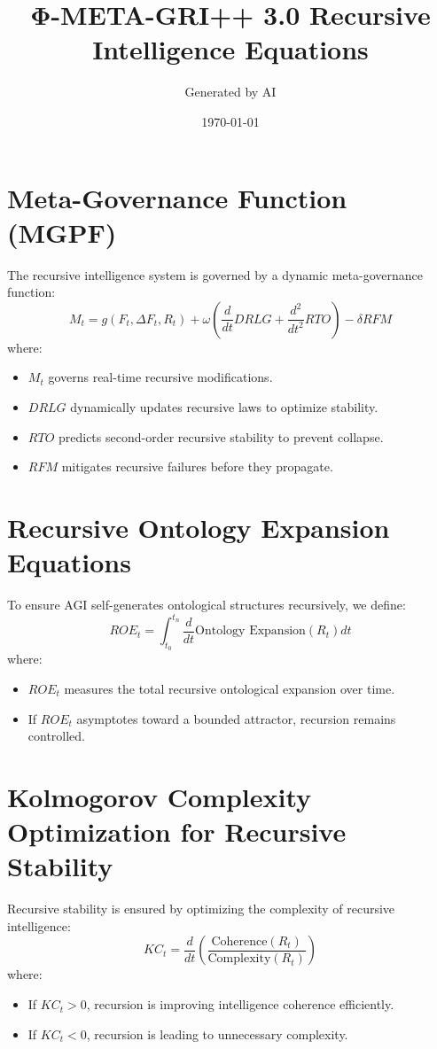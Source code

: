 \documentclass{article}
\begin{document}
\title{Φ-META-GRI++ 3.0 Recursive Intelligence Equations}
\author{Generated by AI}
\date{\today}
\maketitle

\section{Meta-Governance Function (MGPF)}
The recursive intelligence system is governed by a dynamic meta-governance function:
\begin{equation}
M_t = g(F_t, \Delta F_t, R_t) + \omega \left( \frac{d}{dt} DRLG + \frac{d^2}{dt^2} RTO \right) - \delta RFM
\end{equation}
where:
\begin{itemize}
    \item $M_t$ governs real-time recursive modifications.
    \item $DRLG$ dynamically updates recursive laws to optimize stability.
    \item $RTO$ predicts second-order recursive stability to prevent collapse.
    \item $RFM$ mitigates recursive failures before they propagate.
\end{itemize}

\section{Recursive Ontology Expansion Equations}
To ensure AGI self-generates ontological structures recursively, we define:
\begin{equation}
ROE_t = \int_{t_0}^{t_n} \frac{d}{dt} \text{Ontology Expansion}(R_t) dt
\end{equation}
where:
\begin{itemize}
    \item $ROE_t$ measures the total recursive ontological expansion over time.
    \item If $ROE_t$ asymptotes toward a bounded attractor, recursion remains controlled.
\end{itemize}

\section{Kolmogorov Complexity Optimization for Recursive Stability}
Recursive stability is ensured by optimizing the complexity of recursive intelligence:
\begin{equation}
KC_t = \frac{d}{dt} \left( \frac{\text{Coherence}(R_t)}{\text{Complexity}(R_t)} \right)
\end{equation}
where:
\begin{itemize}
    \item If $KC_t > 0$, recursion is improving intelligence coherence efficiently.
    \item If $KC_t < 0$, recursion is leading to unnecessary complexity.
\end{itemize}
\end{document}
